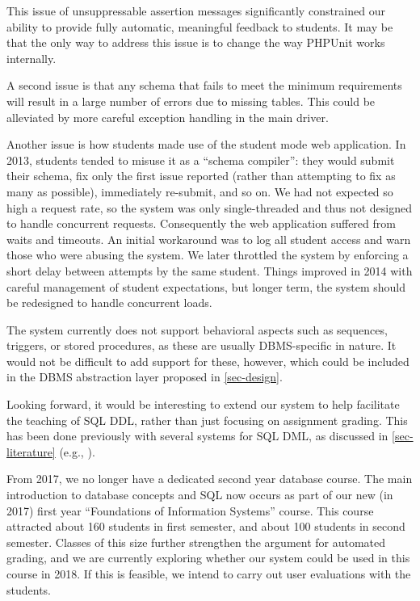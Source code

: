 \documentclass[sigconf, authordraft, capitalise]{acmart}
\begin{document}
This issue of unsuppressable assertion messages significantly constrained our ability to provide fully automatic, meaningful feedback to students. It may be that the only way to address this issue is to change the way PHPUnit works internally.

A second issue is that any schema that fails to meet the minimum requirements will result in a large number of errors due to missing tables.  This could be alleviated by more careful exception handling in the main driver.

Another issue is how students made use of the student mode web application. In 2013, students tended to misuse it as a ``schema compiler'': they would submit their schema, fix only the first issue reported (rather than attempting to fix as many as possible), immediately re-submit, and so on. We had not expected so high a request rate, so the system was only single-threaded and thus not designed to handle concurrent requests. Consequently the web application suffered from waits and timeouts. An initial workaround was to log all student access and warn those who were abusing the system. We later throttled the system by enforcing a short delay between attempts by the same student. Things improved in 2014 with careful management of student expectations, but longer term, the system should be redesigned to handle concurrent loads.

The system currently does not support behavioral aspects such as sequences, triggers, or stored procedures, as these are usually DBMS-specific in nature. It would not be difficult to add support for these, however, which could be included in the DBMS abstraction layer proposed in \cref{sec-design}.

Looking forward, it would be interesting to extend our system to help facilitate the teaching of SQL DDL, rather than just focusing on assignment grading. This has been done previously with several systems for SQL DML, as discussed in \cref{sec-literature} (e.g., \cite{Kenny.C-2005a-Automated,Kleiner.C-2013a-Automated,Mitrovic.A-1998a-Learning,Russell.G-2004a-Improving,Sadiq.S-2004a-SQLator}).

From 2017, we no longer have a dedicated second year database course. The main introduction to database concepts and SQL now occurs as part of our new (in 2017) first year ``Foundations of Information Systems'' course. This course attracted about 160 students in first semester, and about 100 students in second semester. Classes of this size further strengthen the argument for automated grading, and we are currently exploring whether our system could be used in this course in 2018. If this is feasible,  we intend to carry out user evaluations with the students.
\end{document}
